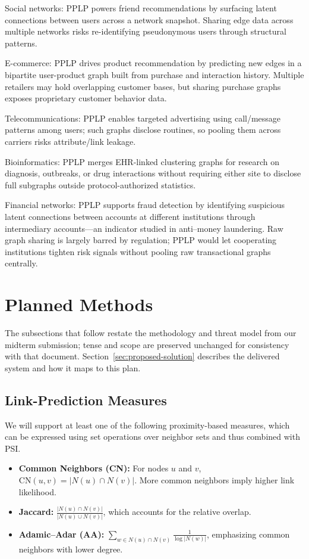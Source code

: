 \documentclass[sigconf]{acmart}
\begin{document}
Social networks: PPLP powers friend recommendations by surfacing latent connections between users across a network snapshot. Sharing edge data across multiple networks risks re-identifying pseudonymous users through structural patterns.

E-commerce: PPLP drives product recommendation by predicting new edges in a bipartite user-product graph built from purchase and interaction history. Multiple retailers may hold overlapping customer bases, but sharing purchase graphs exposes proprietary customer behavior data.

Telecommunications: PPLP enables targeted advertising using call\textendash/message patterns among users; such graphs disclose routines, so pooling them across carriers risks attribute\textendash/link leakage.

Bioinformatics: PPLP merges EHR-linked clustering graphs for research on diagnosis, outbreaks, or drug interactions without requiring either site to disclose full subgraphs outside protocol-authorized statistics.

Financial networks: PPLP supports fraud detection by identifying suspicious latent connections between accounts at different institutions through intermediary accounts---an indicator studied in anti--money laundering. Raw graph sharing is largely barred by regulation; PPLP would let cooperating institutions tighten risk signals without pooling raw transactional graphs centrally.

\section{Planned Methods}
The subsections that follow restate the methodology and threat model from our midterm submission; tense and scope are preserved unchanged for consistency with that document. Section~\ref{sec:proposed-solution} describes the delivered system and how it maps to this plan.

\subsection{Link-Prediction Measures}
We will support at least one of the following proximity-based measures, which can be expressed using set operations over neighbor sets and thus combined with PSI.

\begin{itemize}
  \item \textbf{Common Neighbors (CN):} For nodes $u$ and $v$, $\text{CN}(u,v) = |N(u) \cap N(v)|$. More common neighbors imply higher link likelihood.
  \item \textbf{Jaccard:} $\frac{|N(u) \cap N(v)|}{|N(u) \cup N(v)|}$, which accounts for the relative overlap.
  \item \textbf{Adamic--Adar (AA):} $\sum_{w \in N(u) \cap N(v)} \frac{1}{\log |N(w)|}$, emphasizing common neighbors with lower degree.
\end{itemize}
\end{document}
